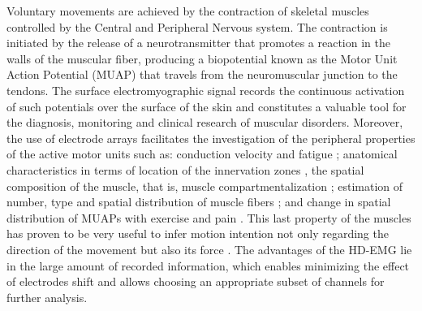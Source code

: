     Voluntary movements are achieved by the contraction of skeletal muscles controlled by the Central and Peripheral Nervous system. The contraction is initiated by the release of a neurotransmitter that promotes a reaction in the walls of the muscular fiber, producing a biopotential known as the Motor Unit Action Potential (MUAP) that travels from the neuromuscular junction to the tendons. The surface electromyographic signal records the continuous activation of such potentials over the surface of the skin and constitutes a valuable tool for the diagnosis, monitoring and clinical research of muscular disorders. Moreover, the use of electrode arrays facilitates the investigation of the peripheral properties of the active motor units such as: conduction velocity and fatigue \citep{Soares2015}; anatomical characteristics in terms of location of the innervation zones \citep{Beck2012}, the spatial composition of the muscle, that is, muscle compartmentalization \citep{Vieira2010}; estimation of number, type and spatial distribution of muscle fibers \citep{Marateb2016}; and change in spatial distribution of MUAPs with exercise and pain \citep{Madeleine2006}. This last property of the muscles has proven to be very useful to infer motion intention not only regarding the direction of the movement but also its force \citep{Rojas-Martinez2013}. The advantages of the HD-EMG lie in the large amount of recorded information, which enables minimizing the effect of electrodes shift and allows choosing an appropriate subset of channels for further analysis.  
    
